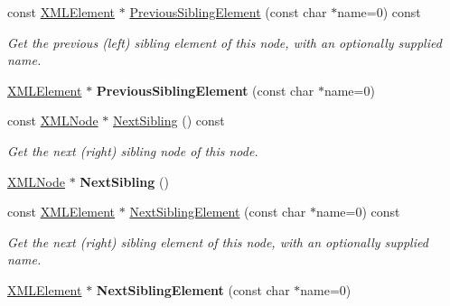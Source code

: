 \begin{DoxyCompactItemize}
const \mbox{\hyperlink{classtinyxml2_1_1XMLElement}{X\+M\+L\+Element}} $\ast$ \mbox{\hyperlink{classtinyxml2_1_1XMLNode_a872936cae46fb473eb47fec99129fc70}{Previous\+Sibling\+Element}} (const char $\ast$name=0) const
\begin{DoxyCompactList}\small\item\em Get the previous (left) sibling element of this node, with an optionally supplied name. \end{DoxyCompactList}\item 
\mbox{\label{classtinyxml2_1_1XMLNode_ae4f37eb6cd405bdf1d57caa066e36d87}} 
\mbox{\hyperlink{classtinyxml2_1_1XMLElement}{X\+M\+L\+Element}} $\ast$ {\bfseries Previous\+Sibling\+Element} (const char $\ast$name=0)
\item 
\mbox{\label{classtinyxml2_1_1XMLNode_a79db9ef0fe014d27790f2218b87bcbb5}} 
const \mbox{\hyperlink{classtinyxml2_1_1XMLNode}{X\+M\+L\+Node}} $\ast$ \mbox{\hyperlink{classtinyxml2_1_1XMLNode_a79db9ef0fe014d27790f2218b87bcbb5}{Next\+Sibling}} () const
\begin{DoxyCompactList}\small\item\em Get the next (right) sibling node of this node. \end{DoxyCompactList}\item 
\mbox{\label{classtinyxml2_1_1XMLNode_aeb7d4dfd8fb924ef86e7cb72183acbac}} 
\mbox{\hyperlink{classtinyxml2_1_1XMLNode}{X\+M\+L\+Node}} $\ast$ {\bfseries Next\+Sibling} ()
\item 
\mbox{\label{classtinyxml2_1_1XMLNode_a1264c86233328f0cd36297552d982f80}} 
const \mbox{\hyperlink{classtinyxml2_1_1XMLElement}{X\+M\+L\+Element}} $\ast$ \mbox{\hyperlink{classtinyxml2_1_1XMLNode_a1264c86233328f0cd36297552d982f80}{Next\+Sibling\+Element}} (const char $\ast$name=0) const
\begin{DoxyCompactList}\small\item\em Get the next (right) sibling element of this node, with an optionally supplied name. \end{DoxyCompactList}\item 
\mbox{\label{classtinyxml2_1_1XMLNode_af1225412584d4a2126f55e96a12e0ec0}} 
\mbox{\hyperlink{classtinyxml2_1_1XMLElement}{X\+M\+L\+Element}} $\ast$ {\bfseries Next\+Sibling\+Element} (const char $\ast$name=0)

\end{DoxyCompactItemize}

